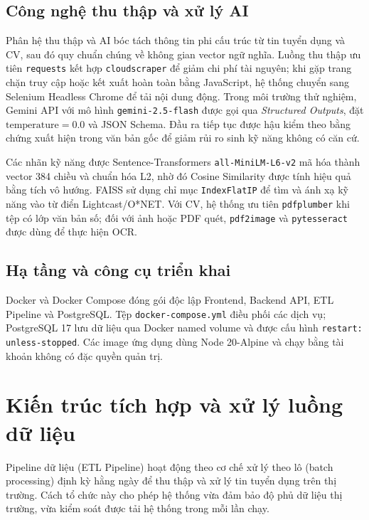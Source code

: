 \subsection{Công nghệ thu thập và xử lý AI}

Phân hệ thu thập và AI bóc tách thông tin phi cấu trúc từ tin tuyển dụng và CV, sau đó quy chuẩn chúng về không gian vector ngữ nghĩa. Luồng thu thập ưu tiên \texttt{requests} kết hợp \texttt{cloudscraper} để giảm chi phí tài nguyên; khi gặp trang chặn truy cập hoặc kết xuất hoàn toàn bằng JavaScript, hệ thống chuyển sang Selenium Headless Chrome để tải nội dung động. Trong môi trường thử nghiệm, Gemini API với mô hình \texttt{gemini-2.5-flash} được gọi qua \textit{Structured Outputs}, đặt $\text{temperature} = 0.0$ và JSON Schema. Đầu ra tiếp tục được hậu kiểm theo bằng chứng xuất hiện trong văn bản gốc để giảm rủi ro sinh kỹ năng không có căn cứ.

Các nhãn kỹ năng được Sentence-Transformers \texttt{all-MiniLM-L6-v2} mã hóa thành vector 384 chiều và chuẩn hóa L2, nhờ đó Cosine Similarity được tính hiệu quả bằng tích vô hướng. FAISS sử dụng chỉ mục \texttt{IndexFlatIP} để tìm và ánh xạ kỹ năng vào từ điển Lightcast/O*NET. Với CV, hệ thống ưu tiên \texttt{pdfplumber} khi tệp có lớp văn bản số; đối với ảnh hoặc PDF quét, \texttt{pdf2image} và \texttt{pytesseract} được dùng để thực hiện OCR.

\subsection{Hạ tầng và công cụ triển khai}

Docker và Docker Compose đóng gói độc lập Frontend, Backend API, ETL Pipeline và PostgreSQL. Tệp \texttt{docker-compose.yml} điều phối các dịch vụ; PostgreSQL 17 lưu dữ liệu qua Docker named volume và được cấu hình \texttt{restart: unless-stopped}. Các image ứng dụng dùng Node 20-Alpine và chạy bằng tài khoản không có đặc quyền quản trị.

\section{Kiến trúc tích hợp và xử lý luồng dữ liệu}

Pipeline dữ liệu (ETL Pipeline) hoạt động theo cơ chế xử lý theo lô (batch processing) định kỳ hằng ngày để thu thập và xử lý tin tuyển dụng trên thị trường. Cách tổ chức này cho phép hệ thống vừa đảm bảo độ phủ dữ liệu thị trường, vừa kiểm soát được tải hệ thống trong mỗi lần chạy.

